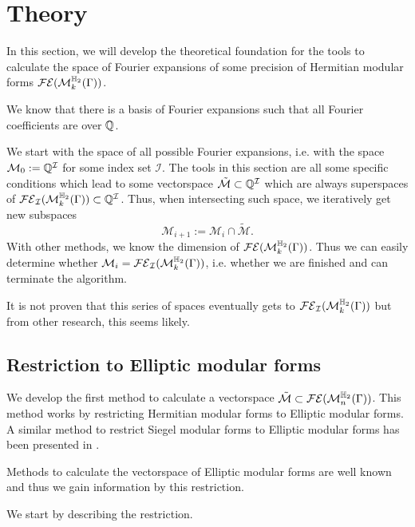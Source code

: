 
\section{Theory}


In this section, we will develop the theoretical foundation for the tools to calculate the space of Fourier expansions of some precision of Hermitian modular forms $\mathcal{FE}(\operatorname{\mathcal{M}}^{\mathbb{H}_{2}}_{k} (\Gamma))$.

We know that there is a basis of Fourier expansions such that all Fourier coefficients are over $\mathbb{Q}$. %

We start with the space of all possible Fourier expansions, i.e. with the space $\mathcal{M}_0 := \mathbb{Q}^\mathcal{I}$ for some index set $\mathcal{I}$. The tools in this section are all some specific conditions which lead to some vectorspace $\tilde{\mathcal{M}} \subset \mathbb{Q}^\mathcal{I}$ which are always superspaces of $\mathcal{FE}_\mathcal{I}(\operatorname{\mathcal{M}}^{\mathbb{H}_{2}}_{k} (\Gamma)) \subset \mathbb{Q}^\mathcal{I}$. Thus, when intersecting such space, we iteratively get new subspaces
\[ \mathcal{M}_{i+1} := \mathcal{M}_i \cap \tilde{\mathcal{M}} . \]
%
With other methods, we know the dimension of $\mathcal{FE}(\operatorname{\mathcal{M}}^{\mathbb{H}_{2}}_{k} (\Gamma))$. Thus we can easily determine whether $\mathcal{M}_i = \mathcal{FE}_\mathcal{I}(\operatorname{\mathcal{M}}^{\mathbb{H}_{2}}_{k} (\Gamma))$, i.e. whether we are finished and can terminate the algorithm.

It is not proven that this series of spaces eventually gets to $\mathcal{FE}_\mathcal{I}(\operatorname{\mathcal{M}}^{\mathbb{H}_{2}}_{k} (\Gamma))$ but from other research, this seems likely.

\subsection{Restriction to Elliptic modular forms}
\label{ellipticReduction}
\label{ellipticRestriction}

We develop the first method to calculate a vectorspace $\tilde{\mathcal{M}} \subset \mathcal{FE}(\operatorname{\mathcal{M}}^{\mathbb{H}_{2}}_{n} (\Gamma))$. This method works by restricting Hermitian modular forms to Elliptic modular forms. A similar method to restrict Siegel modular forms to Elliptic modular forms has been presented in \cite{PoorYuen07Comp}.
 
Methods to calculate the vectorspace of Elliptic modular forms are well known and thus we gain information by this restriction.

We start by describing the restriction.

